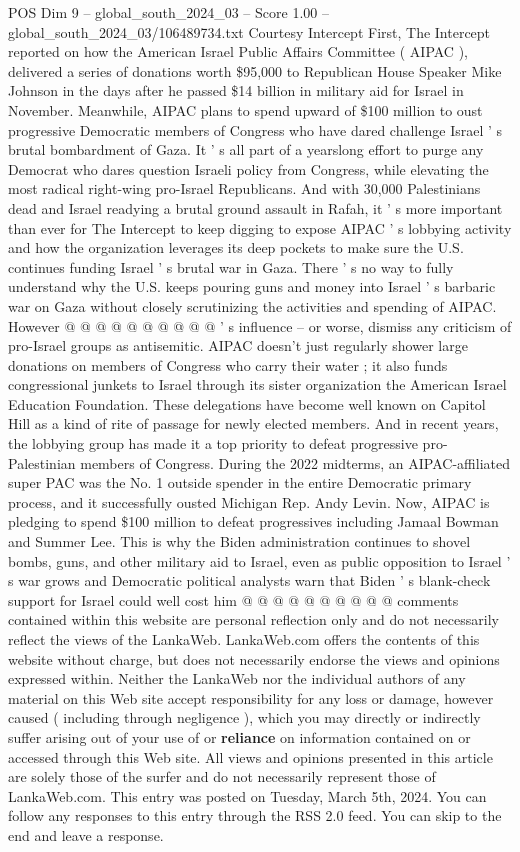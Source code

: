 \begin{textsample}{POS Dim 9 – global\_south\_2024\_03 – Score 1.00 – global\_south\_2024\_03/106489734.txt}  \label{ex:f9_pos_069}
Courtesy Intercept First, The Intercept reported on how the American Israel Public Affairs Committee ( AIPAC ), delivered a series of donations worth \$95,000 to Republican House Speaker Mike Johnson in the days after he passed \$14 billion in military aid for Israel in November.
Meanwhile, AIPAC plans to spend upward of \$100 million to oust progressive Democratic members of Congress who have dared challenge Israel ' s brutal bombardment of Gaza.
It ' s all part of a yearslong effort to purge any Democrat who dares question Israeli policy from Congress, while elevating the most radical right-wing pro-Israel Republicans.
And with 30,000 Palestinians dead and Israel readying a brutal ground assault in Rafah, it ' s more important than ever for The Intercept to keep digging to expose AIPAC ' s lobbying activity and how the organization leverages its deep pockets to make sure the U.S. continues funding Israel ' s brutal war in Gaza.
There ' s no way to fully understand why the U.S. keeps pouring guns and money into Israel ' s barbaric war on Gaza without closely scrutinizing the activities and spending of AIPAC.
However @ @ @ @ @ @ @ @ @ @ ' s influence -- or worse, dismiss any criticism of pro-Israel groups as antisemitic.
AIPAC doesn't just regularly shower large donations on members of Congress who carry their water ; it also funds congressional junkets to Israel through its sister organization the American Israel Education Foundation.
These delegations have become well known on Capitol Hill as a kind of rite of passage for newly elected members.
And in recent years, the lobbying group has made it a top priority to defeat progressive pro-Palestinian members of Congress.
During the 2022 midterms, an AIPAC-affiliated super PAC was the No. 1 outside spender in the entire Democratic primary process, and it successfully ousted Michigan Rep.
Andy Levin.
Now, AIPAC is pledging to spend \$100 million to defeat progressives including Jamaal Bowman and Summer Lee.
This is why the Biden administration continues to shovel bombs, guns, and other military aid to Israel, even as public opposition to Israel ' s war grows and Democratic political analysts warn that Biden ' s blank-check support for Israel could well cost him @ @ @ @ @ @ @ @ @ @ comments contained within this website are personal reflection only and do not necessarily reflect the views of the LankaWeb.
LankaWeb.com offers the contents of this website without charge, but does not necessarily endorse the views and opinions expressed within.
Neither the LankaWeb nor the individual authors of any material on this Web site accept responsibility for any loss or damage, however caused ( including through negligence ), which you may directly or indirectly suffer arising out of your use of or \textbf{reliance} on information contained on or accessed through this Web site.
All views and opinions presented in this article are solely those of the surfer and do not necessarily represent those of LankaWeb.com.
This entry was posted on Tuesday, March 5th, 2024.
You can follow any responses to this entry through the RSS 2.0 feed.
You can skip to the end and leave a response.

\end{textsample}
